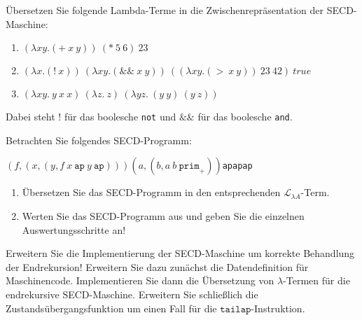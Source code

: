 \begin{aufgabe}
  Übersetzen Sie folgende Lambda-Terme in die Zwischenrepräsentation
  der SECD-Maschine:
  
  \begin{enumerate}
  \item \((\lambda xy.(+\:x\:y))\:(*\:5\:6)\:23\)

  \item \((\lambda x.(!\:x))\:(\lambda xy.(\&\&\:x\:y))\:((\lambda xy.(>\:x\:y))\:23~42)\:true\)

   
  \item \((\lambda xy.\:y\:x\:x)\:(\lambda z.\:z)\:(\lambda yz.\:(y\:y)\:(y\:z))\)

  \end{enumerate}

  Dabei steht $!$ für das boolesche \texttt{not} und $\&\&$ für das
  boolesche \texttt{and}.
\end{aufgabe}

\begin{aufgabe}
 Betrachten Sie folgendes SECD-Programm:
 
 \newcommand{\tuple}[2]{\ensuremath{(#1,#2)}}

 \begin{center}
   \tuple{f}{\tuple{x}{\tuple{y}{f\:x\:\texttt{ap}\:y\:\texttt{ap}}}}\:\tuple{a}{\tuple{b}{a\:b\:\texttt{prim}_+}}\:\texttt{ap}\:\texttt{ap}\:\texttt{ap}
 \end{center}
 
 \begin{enumerate}
   \item Übersetzen Sie das SECD-Programm in den entsprechenden
   $\mathcal{L}_{\lambda{}A}$-Term.
   \item Werten Sie das SECD-Programm aus und geben Sie die einzelnen
     Auswertungsschritte an!
 \end{enumerate}
  
\end{aufgabe}

\begin{aufgabe}\label{aufgabe:secd-endekursiv-implementieren}
  Erweitern Sie die Implementierung der SECD-Maschine um korrekte
  Behandlung der Endrekursion!  Erweitern Sie dazu zunächst die
  Datendefinition für Maschinencode. Implementieren Sie dann die
  Übersetzung von $\lambda$-Termen für die endrekursive SECD-Maschine.
  Erweitern Sie schließlich die Zustandsübergangsfunktion um einen
  Fall für die $\mathtt{tailap}$-Instruktion.
\end{aufgabe}

